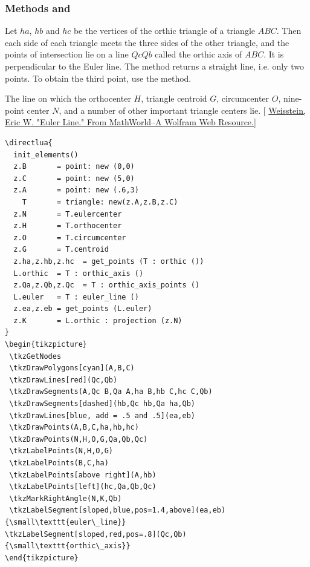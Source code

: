 \subsubsection{Methods  and } %
\label{ssub:euler_line}

Let $ha$, $hb$ and $hc$ be the vertices of the orthic triangle of a triangle $ABC$. Then each side of each triangle meets the three sides of the other triangle, and the points of intersection lie on a line $QcQb$ called the orthic axis of $ABC$. It is perpendicular to the Euler line. The  method returns a straight line, i.e. only two points. To obtain the third point, use the  method.

The line on which the orthocenter $H$, triangle centroid $G$, circumcenter $O$, nine-point center $N$, and a number of other important triangle centers lie.
[ \href{https://mathworld.wolfram.com/EulerLine.html}{Weisstein, Eric W. "Euler Line." From MathWorld--A Wolfram Web Resource.}]

\begin{Verbatim}
\directlua{
  init_elements()
  z.B       = point: new (0,0)
  z.C       = point: new (5,0)
  z.A       = point: new (.6,3)
    T       = triangle: new(z.A,z.B,z.C)
  z.N       = T.eulercenter
  z.H       = T.orthocenter
  z.O       = T.circumcenter
  z.G       = T.centroid
  z.ha,z.hb,z.hc  = get_points (T : orthic ())
  L.orthic  = T : orthic_axis ()
  z.Qa,z.Qb,z.Qc  = T : orthic_axis_points ()
  L.euler   = T : euler_line ()
  z.ea,z.eb = get_points (L.euler)
  z.K       = L.orthic : projection (z.N)
}
\begin{tikzpicture}
 \tkzGetNodes
 \tkzDrawPolygons[cyan](A,B,C)
 \tkzDrawLines[red](Qc,Qb)
 \tkzDrawSegments(A,Qc B,Qa A,ha B,hb C,hc C,Qb)
 \tkzDrawSegments[dashed](hb,Qc hb,Qa ha,Qb)
 \tkzDrawLines[blue, add = .5 and .5](ea,eb)
 \tkzDrawPoints(A,B,C,ha,hb,hc)
 \tkzDrawPoints(N,H,O,G,Qa,Qb,Qc)
 \tkzLabelPoints(N,H,O,G)
 \tkzLabelPoints(B,C,ha)
 \tkzLabelPoints[above right](A,hb)
 \tkzLabelPoints[left](hc,Qa,Qb,Qc)
 \tkzMarkRightAngle(N,K,Qb)
 \tkzLabelSegment[sloped,blue,pos=1.4,above](ea,eb){\small\texttt{euler\_line}}
\tkzLabelSegment[sloped,red,pos=.8](Qc,Qb){\small\texttt{orthic\_axis}}
\end{tikzpicture}
\end{Verbatim}

